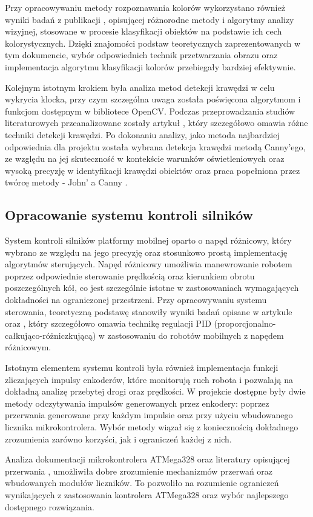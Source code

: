 Przy opracowywaniu metody rozpoznawania kolorów wykorzystano również wyniki badań z publikacji \cite{bib:artykul2}, opisującej różnorodne metody i algorytmy analizy wizyjnej, stosowane w procesie klasyfikacji obiektów na podstawie ich cech kolorystycznych. Dzięki znajomości podstaw teoretycznych zaprezentowanych w tym dokumencie, wybór odpowiednich technik przetwarzania obrazu oraz implementacja algorytmu klasyfikacji kolorów przebiegały bardziej efektywnie.

Kolejnym istotnym krokiem była analiza metod detekcji krawędzi w celu wykrycia klocka, przy czym szczególna uwaga została poświęcona algorytmom i funkcjom dostępnym w bibliotece OpenCV. Podczas przeprowadzania studiów literaturowych przeanalizowane zostały artykuł \cite{bib:artykul}, który szczegółowo omawia różne techniki detekcji krawędzi. Po dokonaniu analizy, jako metoda najbardziej odpowiednia dla projektu została wybrana detekcja krawędzi metodą Canny’ego, ze względu na jej skuteczność w kontekście warunków oświetleniowych oraz wysoką precyzję w identyfikacji krawędzi obiektów oraz praca popełniona przez twórcę metody - John' a Canny \cite{bib:canny-article}.


\subsection{Opracowanie systemu kontroli silników}
\label{sec:opracowanie-silnik}
System kontroli silników platformy mobilnej oparto o napęd różnicowy, który wybrano ze względu na jego precyzję oraz stosunkowo prostą implementację algorytmów sterujących. Napęd różnicowy umożliwia manewrowanie robotem poprzez odpowiednie sterowanie prędkością oraz kierunkiem obrotu poszczególnych kół, co jest szczególnie istotne w zastosowaniach wymagających dokładności na ograniczonej przestrzeni. Przy opracowywaniu systemu sterowania, teoretyczną podstawę stanowiły wyniki badań opisane w artykule \cite{bib:konferencja} oraz \cite{bib:encoders-pid}, który szczegółowo omawia technikę regulacji PID (proporcjonalno-całkująco-różniczkującą) w zastosowaniu do robotów mobilnych z napędem różnicowym. 

Istotnym elementem systemu kontroli była również implementacja funkcji zliczających impulsy enkoderów, które monitorują ruch robota i pozwalają na dokładną analizę przebytej drogi oraz prędkości. W projekcie dostępne były dwie metody odczytywania impulsów generowanych przez enkodery: poprzez przerwania generowane przy każdym impulsie oraz przy użyciu wbudowanego licznika mikrokontrolera. Wybór metody wiązał się z koniecznością dokładnego zrozumienia zarówno korzyści, jak i ograniczeń każdej z nich.

Analiza dokumentacji mikrokontrolera ATMega328 \cite{bib:manualarduino} oraz literatury opisującej przerwania \cite{bib:artykul1}, umożliwiła dobre zrozumienie mechanizmów przerwań oraz wbudowanych modułów liczników. To pozwoliło na rozumienie ograniczeń wynikających z zastosowania kontrolera ATMega328 oraz wybór najlepszego dostępnego rozwiązania. 

